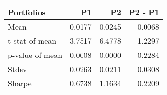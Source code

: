 \begin{tabular}{lrrr}
\toprule
Portfolios & P1 & P2 & P2 - P1 \\
\midrule
Mean & 0.0177 & 0.0245 & 0.0068 \\
t-stat of mean & 3.7517 & 6.4778 & 1.2297 \\
p-value of mean & 0.0008 & 0.0000 & 0.2284 \\
Stdev & 0.0263 & 0.0211 & 0.0308 \\
Sharpe & 0.6738 & 1.1634 & 0.2209 \\
\bottomrule
\end{tabular}
